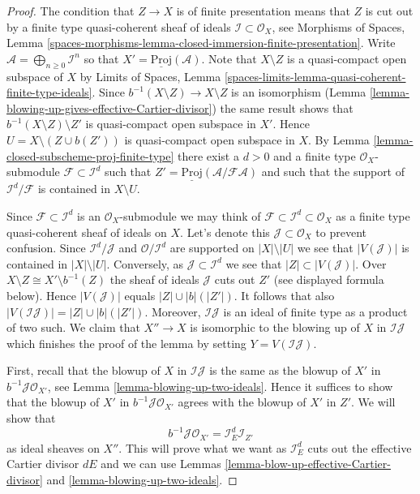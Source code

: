 \documentclass{stacks-project}
\theoremstyle{plain}
\theoremstyle{definition}
\theoremstyle{remark}
\numberwithin{equation}{subsection}
\begin{document}
\begin{proof}
The condition that $Z \to X$ is of finite presentation means that
$Z$ is cut out by a finite type quasi-coherent sheaf of ideals
$\mathcal{I} \subset \mathcal{O}_X$, see
Morphisms of Spaces, Lemma
\ref{spaces-morphisms-lemma-closed-immersion-finite-presentation}.
Write $\mathcal{A} = \bigoplus_{n \geq 0} \mathcal{I}^n$ so that
$X' = \underline{\text{Proj}}(\mathcal{A})$.
Note that $X \setminus Z$ is a quasi-compact open subspace of $X$ by
Limits of Spaces, Lemma
\ref{spaces-limits-lemma-quasi-coherent-finite-type-ideals}.
Since $b^{-1}(X \setminus Z) \to X \setminus Z$ is an isomorphism
(Lemma \ref{lemma-blowing-up-gives-effective-Cartier-divisor}) the same
result shows that
$b^{-1}(X \setminus Z) \setminus Z'$ is quasi-compact open subspace in $X'$.
Hence $U = X \setminus (Z \cup b(Z'))$ is quasi-compact open subspace in $X$.
By Lemma \ref{lemma-closed-subscheme-proj-finite-type}
there exist a $d > 0$ and a finite type
$\mathcal{O}_X$-submodule $\mathcal{F} \subset \mathcal{I}^d$ such
that $Z' = \underline{\text{Proj}}(\mathcal{A}/\mathcal{F}\mathcal{A})$
and such that the support of $\mathcal{I}^d/\mathcal{F}$ is contained
in $X \setminus U$.

\medskip\noindent
Since $\mathcal{F} \subset \mathcal{I}^d$ is an $\mathcal{O}_X$-submodule
we may think of $\mathcal{F} \subset \mathcal{I}^d \subset \mathcal{O}_X$
as a finite type quasi-coherent sheaf of ideals on $X$. Let's denote this
$\mathcal{J} \subset \mathcal{O}_X$ to prevent confusion. Since
$\mathcal{I}^d / \mathcal{J}$ and $\mathcal{O}/\mathcal{I}^d$ are
supported on $|X| \setminus |U|$ we see that $|V(\mathcal{J})|$ is contained
in $|X| \setminus |U|$. Conversely, as $\mathcal{J} \subset \mathcal{I}^d$
we see that $|Z| \subset |V(\mathcal{J})|$. Over
$X \setminus Z \cong X' \setminus b^{-1}(Z)$ the sheaf of ideals
$\mathcal{J}$ cuts out $Z'$ (see displayed formula below). Hence
$|V(\mathcal{J})|$ equals $|Z| \cup |b|(|Z'|)$. It follows that also
$|V(\mathcal{I}\mathcal{J})| = |Z| \cup |b|(|Z'|)$. Moreover,
$\mathcal{I}\mathcal{J}$ is an ideal of finite type as a product of two such.
We claim that $X'' \to X$ is isomorphic to the blowing up of $X$ in
$\mathcal{I}\mathcal{J}$ which finishes the proof of the lemma by setting
$Y = V(\mathcal{I}\mathcal{J})$.

\medskip\noindent
First, recall that the blowup of $X$ in $\mathcal{I}\mathcal{J}$
is the same as the blowup of $X'$ in $b^{-1}\mathcal{J} \mathcal{O}_{X'}$,
see Lemma \ref{lemma-blowing-up-two-ideals}.
Hence it suffices to show that the blowup of $X'$ in
$b^{-1}\mathcal{J} \mathcal{O}_{X'}$ agrees with the blowup of $X'$
in $Z'$. We will show that
$$
b^{-1}\mathcal{J} \mathcal{O}_{X'} = \mathcal{I}_E^d \mathcal{I}_{Z'}
$$
as ideal sheaves on $X''$. This will prove what we want as
$\mathcal{I}_E^d$ cuts out the effective Cartier divisor $dE$
and we can use Lemmas \ref{lemma-blow-up-effective-Cartier-divisor} and
\ref{lemma-blowing-up-two-ideals}.


\end{proof}
\end{document}
